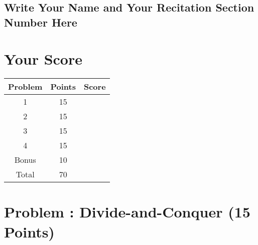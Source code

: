 \documentclass[12pt]{amsart}
\newcounter{pNum}
\newcommand{\problem}[2]{\addtocounter{pNum}{1}
\section*{Problem \arabic{pNum}: #1 (#2 Points)}}
\begin{document}
\vfill


\begin{framed}
\vspace{-0.3cm}
\section*{Write Your Name and Your Recitation Section Number Here}
\begin{center}{\hspace{2cm}} \end{center}
\vspace{1cm}
\end{framed}
\vfill

\newpage

\vfill

\hspace{0cm}

\vfill

\section*{Your Score}

\vfill

\begin{center}
\begin{tabular}{|c|c|c|}
\hline
Problem &
Points &
Score \\ \hline
1 & 15 & \\ \hline
2 & 15 & \\ \hline
3 & 15 & \\ \hline
4 & 15 & \\ \hline
Bonus & 10 & \\ \hline
Total & 70 & \\
\hline
\end{tabular}
\end{center}

\vfill

\hspace{0cm}

\vfill

\newpage

\newpage

\problem{Divide-and-Conquer}{15}
\end{document}
